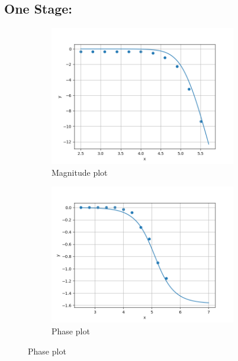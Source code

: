 \documentclass[a4paper,12pt]{article}
\begin{document}
\subsection*{One Stage:}
\begin{figure}[h!]
	\begin{subfigure}[b]{100pt}
		\caption{Magnitude plot}
		\includegraphics[width = 230pt]{figs/fig1.png}
	\end{subfigure}
	\hspace{110pt}
	\begin{subfigure}[b]{100pt}
		\caption{Phase plot}
		\includegraphics[width = 230pt]{figs/fig2.png}
	\end{subfigure}
\end{figure}
\end{document}
